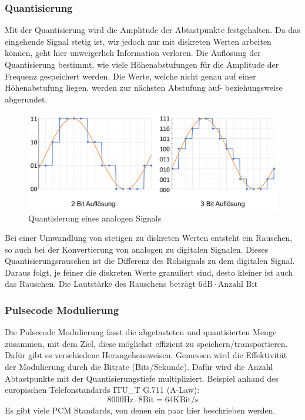 \documentclass{article}
\begin{document}
\subsubsection{Quantisierung}
Mit der Quantisierung wird die Amplitude der Abtastpunkte festgehalten. Da das eingehende Signal stetig ist, wir jedoch nur mit diskreten Werten arbeiten können, geht hier unweigerlich Information verloren. Die Auflösung der Quantisierung bestimmt, wie viele Höhenabstufungen für die Amplitude der Frequenz gespeichert werden. Die Werte, welche nicht genau auf einer Höhenabstufung liegen, werden zur nächsten Abstufung auf- beziehungsweise abgerundet.
\begin{figure}[h]
		\includegraphics[width=\linewidth]{img/audioQuantisierung.png}
		\caption{Quantisierung eines analogen Signals}
		\label{fig:Quantisierung eines analogen Signals}
\end{figure}
\newline
Bei einer Umwandlung von stetigen zu diskreten Werten entsteht ein Rauschen, so auch bei der Konvertierung von analogen zu digitalen Signalen. Dieses Quantisierungsrauschen ist die Differenz des Rohsignals zu dem digitalen Signal. Daraus folgt, je feiner die diskreten Werte granuliert sind, desto kleiner ist auch das Rauschen. Die Lautstärke des Rauschens beträgt $6\textrm{dB} \cdot \textrm{Anzahl Bit}$
\subsubsection{Pulsecode Modulierung}
Die Pulsecode Modulierung fasst die abgetasteten und quantisierten Menge zusammen, mit dem Ziel, diese möglichst effizient zu speichern/transportieren. Dafür gibt es verschiedene Herangehensweisen. Gemessen wird die Effektivität der Modulierung durch die Bitrate (Bits/Sekunde). Dafür wird die Anzahl Abtastpunkte mit der Quantisierungstiefe multipliziert. Beispiel anhand des europischen Telefonstandards ITU\_T G.711 (A-Law): $$8000\textrm{Hz} \cdot 8\textrm{Bit} = 64 \textrm{KBit/s}$$
Es gibt viele PCM Standards, von denen ein paar hier beschrieben werden.
\end{document}
